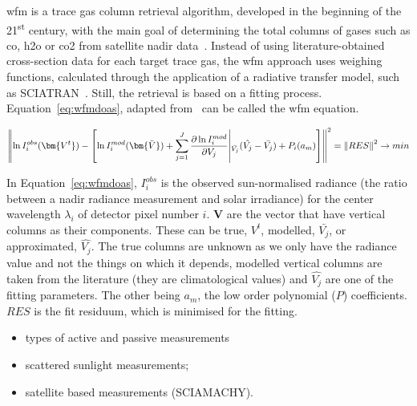 \gls{wfm} is a trace gas column retrieval algorithm, developed in the
beginning of the 21\textsuperscript{st} century, with the main goal of
determining the total columns of gases such as \gls{co}, \gls{h2o} or
\gls{co2} from satellite nadir data~\cite{Buchwitz2004}. Instead of
using literature-obtained cross-section data for each target trace gas,
the \gls{wfm} approach uses weighing functions, calculated through the
application of a radiative transfer model, such as
SCIATRAN~\cite{Rozanov2002}. Still, the retrieval is based on a
fitting process. Equation~\ref{eq:wfmdoas}, adapted
from~\cite{Buchwitz2000, Buchwitz2004} can be called the \gls{wfm}
equation.

\begin{equation}
    \centering
    \left \lVert \ln I_{i}^{obs}(\bm{V^t}) - \left[ \ln
            I_{i}^{mod}(\bm{\bar{V}}) +
        \sum_{j=1}^{J} \frac{\partial \ln I_{i}^{mod}}{\partial V_{j}}
        \middle \vert_{\bar{V_{j}}} (\hat{V_{j}} - \bar{V_{j}}) +
        P_{i}(a_m)
    \right] \right\rVert^{2} = \left \lVert RES \right \rVert^2
    \rightarrow min
    \label{eq:wfmdoas}
\end{equation}

In Equation~\ref{eq:wfmdoas}, $I_{i}^{obs}$ is the observed
sun-normalised radiance (the ratio between a nadir radiance measurement
and solar irradiance) for the center wavelength $\lambda_i$ of detector
pixel number $i$. $\bm{V}$ are the vector that have vertical columns as
their components. These can be true, $V^t$, modelled, $\bar{V_j}$, or
approximated, $\hat{V_j}$. The true columns are unknown as we only have
the radiance value and not the things on which it depends, modelled
vertical columns are taken from the literature (they are climatological
values) and $\hat{V_j}$ are one of the fitting parameters. The other
being $a_m$, the low order polynomial ($P$) coefficients. $RES$ is
the fit residuum, which is minimised for the fitting. 


\begin{itemize}
    \item types of active and passive measurements
    \item scattered sunlight measurements;
    \item satellite based measurements (SCIAMACHY).
\end{itemize}

